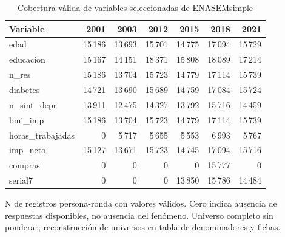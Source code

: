 \begin{table}[!htbp]
\centering
\caption{Cobertura válida de variables seleccionadas de ENASEMsimple}\label{tab:eda-simple-cobertura}
\small\setlength{\tabcolsep}{4pt}
\renewcommand{\arraystretch}{1.15}
\begin{tabular}{lrrrrrr}
\toprule
\textbf{Variable} & \textbf{2001} & \textbf{2003} & \textbf{2012} & \textbf{2015} & \textbf{2018} & \textbf{2021} \\
\midrule
edad & 15\,186 & 13\,693 & 15\,701 & 14\,775 & 17\,094 & 15\,729 \\
educacion & 15\,167 & 14\,151 & 18\,371 & 15\,808 & 18\,089 & 17\,214 \\
n\_res & 15\,186 & 13\,704 & 15\,723 & 14\,779 & 17\,114 & 15\,739 \\
diabetes & 14\,721 & 13\,690 & 15\,689 & 14\,759 & 17\,084 & 15\,724 \\
n\_sint\_depr & 13\,911 & 12\,475 & 14\,327 & 13\,792 & 15\,716 & 14\,459 \\
bmi\_imp & 15\,186 & 13\,704 & 15\,723 & 14\,779 & 17\,114 & 15\,739 \\
horas\_trabajadas & 0 & 5\,717 & 5\,655 & 5\,553 & 6\,993 & 5\,767 \\
imp\_neto & 15\,127 & 13\,671 & 15\,723 & 14\,745 & 17\,094 & 15\,716 \\
compras & 0 & 0 & 0 & 0 & 15\,777 & 0 \\
serial7 & 0 & 0 & 0 & 13\,850 & 15\,786 & 14\,484 \\
\bottomrule
\end{tabular}
\par\medskip
\parbox{\linewidth}{\footnotesize N de registros persona-ronda con valores válidos. Cero indica ausencia de respuestas disponibles, no ausencia del fenómeno. Universo completo sin ponderar; reconstrucción de universos en tabla de denominadores y fichas.}
\end{table}

